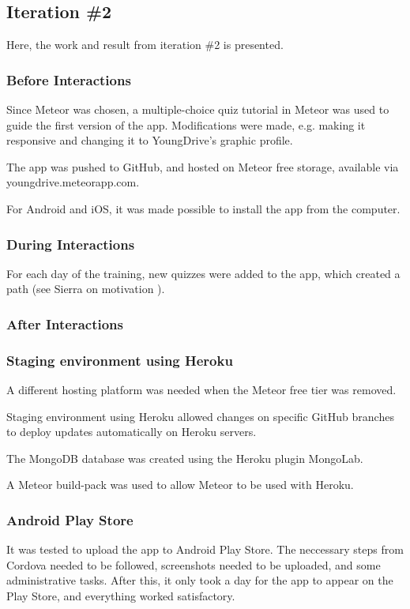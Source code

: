 \subsection{Iteration \#2}
Here, the work and result from iteration \#2 is presented.

\subsubsection{Before Interactions}

Since Meteor was chosen, a multiple-choice quiz tutorial in Meteor was used to guide the first version of the app. Modifications were made, e.g. making it responsive and changing it to YoungDrive's graphic profile.

The app was pushed to GitHub, and hosted on Meteor free storage, available via youngdrive.meteorapp.com.

For Android and iOS, it was made possible to install the app from the computer.

\subsubsection{During Interactions}
For each day of the training, new quizzes were added to the app, which created a path (see Sierra on motivation \cite{Sierra}).

\subsubsection{After Interactions}

\subsubsection{Staging environment using Heroku}
A different hosting platform was needed when the Meteor free tier was removed.

Staging environment using Heroku allowed changes on specific GitHub branches to deploy updates automatically on Heroku servers.

The MongoDB database was created using the Heroku plugin MongoLab.

A Meteor build-pack was used to allow Meteor to be used with Heroku.

\subsubsection{Android Play Store}
It was tested to upload the app to Android Play Store. The neccessary steps from Cordova needed to be followed, screenshots needed to be uploaded, and some administrative tasks. After this, it only took a day for the app to appear on the Play Store, and everything worked satisfactory.

